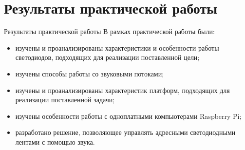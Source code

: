 \section{Результаты практической работы}
\begin{frame}{Результаты практической работы}
  \large
  В рамках практической работы были:
  
  \begin{itemize}
    \item изучены и проанализированы характеристики и особенности работы светодиодов, подходящих для реализации поставленной цели;
    \item изучены способы работы со звуковыми потоками;
    \item изучены и проанализированы характеристик платформ, подходящих для реализации поставленной задачи;
    \item изучены особенности работы с одноплатными компьютерами Raspberry Pi;
    \item разработано решение, позволяющее управлять адресными светодиодными лентами с помощью звука.
  \end{itemize}
\end{frame}